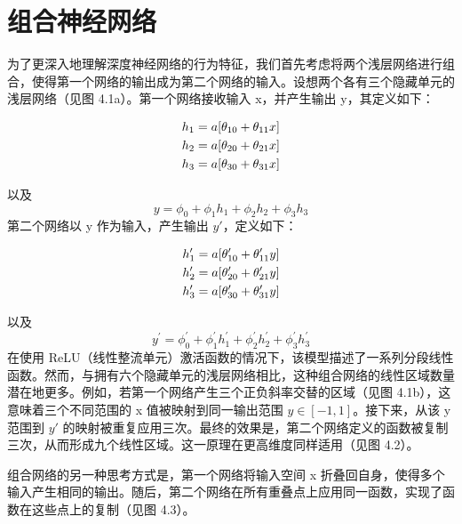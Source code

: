 \documentclass[lang=cn,newtx,10pt,scheme=chinese]{elegantbook}
\begin{document}
\section{组合神经网络}

为了更深入地理解深度神经网络的行为特征，我们首先考虑将两个浅层网络进行组合，使得第一个网络的输出成为第二个网络的输入。设想两个各有三个隐藏单元的浅层网络（见图 4.1a）。第一个网络接收输入 x，并产生输出 y，其定义如下：

\begin{align}
h_1 = a[\theta_{10}+\theta_{11}x] \notag \\
h_2 = a[\theta_{20}+\theta_{21}x] \notag \\
h_3 = a[\theta_{30}+\theta_{31}x] 
\end{align} 

以及
\begin{equation}
y = \phi_0 + \phi_1h_1 + \phi_2h_2 + \phi_3h_3 
\end{equation}
第二个网络以 y 作为输入，产生输出 \(y \prime\)，定义如下：

\begin{align}
h^\prime_1 = a[\theta^\prime_{10}+\theta^\prime_{11}y] \notag \\
h^\prime_2 = a[\theta^\prime_{20}+\theta^\prime_{21}y] \notag \\
h^\prime_3 = a[\theta^\prime_{30}+\theta^\prime_{31}y] 
\end{align} 


以及
\begin{equation}
y^\prime = \phi^\prime_0 + \phi^\prime_1h^\prime_1 + \phi^\prime_2h^\prime_2 + \phi^\prime_3h^\prime_3 
\end{equation}
在使用 ReLU（线性整流单元）激活函数的情况下，该模型描述了一系列分段线性函数。然而，与拥有六个隐藏单元的浅层网络相比，这种组合网络的线性区域数量潜在地更多。例如，若第一个网络产生三个正负斜率交替的区域（见图 4.1b），这意味着三个不同范围的 x 值被映射到同一输出范围 \(y \in [−1, 1]\)。接下来，从该 y 范围到 \(y \prime\) 的映射被重复应用三次。最终的效果是，第二个网络定义的函数被复制三次，从而形成九个线性区域。这一原理在更高维度同样适用（见图 4.2）。


组合网络的另一种思考方式是，第一个网络将输入空间 x 折叠回自身，使得多个输入产生相同的输出。随后，第二个网络在所有重叠点上应用同一函数，实现了函数在这些点上的复制（见图 4.3）。
\end{document}
